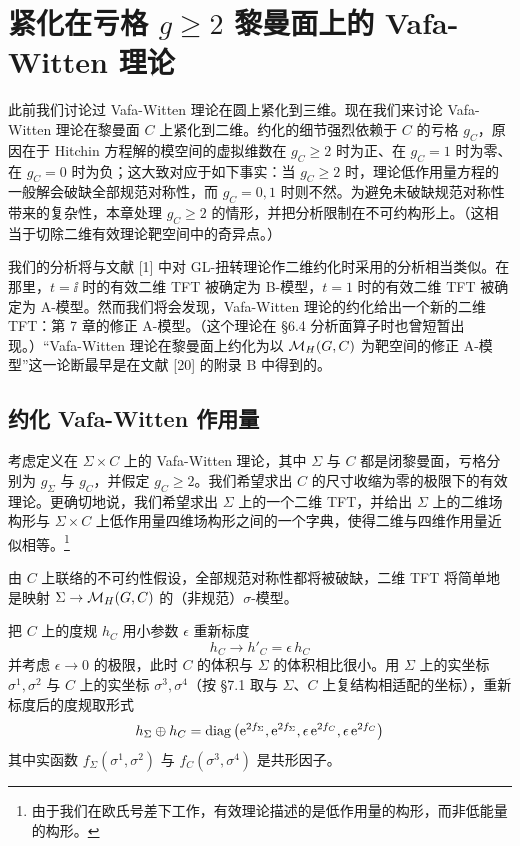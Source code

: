 \chapter{紧化在亏格 \texorpdfstring{$g\ge 2$}{g>=2} 黎曼面上的 Vafa-Witten 理论}

此前我们讨论过 Vafa-Witten 理论在圆上紧化到三维。现在我们来讨论 Vafa-Witten 理论在黎曼面 $C$ 上紧化到二维。约化的细节强烈依赖于 $C$ 的亏格 $g_C$，原因在于 Hitchin 方程解的模空间的虚拟维数在 $g_C\ge 2$ 时为正、在 $g_C=1$ 时为零、在 $g_C=0$ 时为负；这大致对应于如下事实：当 $g_C\ge 2$ 时，理论低作用量方程的一般解会破缺全部规范对称性，而 $g_C=0,1$ 时则不然。为避免未破缺规范对称性带来的复杂性，本章处理 $g_C\ge 2$ 的情形，并把分析限制在不可约构形上。（这相当于切除二维有效理论靶空间中的奇异点。）

我们的分析将与文献 [1] 中对 GL-扭转理论作二维约化时采用的分析相当类似。在那里，$t=\ii$ 时的有效二维 TFT 被确定为 B-模型，$t=1$ 时的有效二维 TFT 被确定为 A-模型。然而我们将会发现，Vafa-Witten 理论的约化给出一个新的二维 TFT：第 7 章的修正 A-模型。（这个理论在 §6.4 分析面算子时也曾短暂出现。）“Vafa-Witten 理论在黎曼面上约化为以 $\mathcal{M}_H(G,C)$ 为靶空间的修正 A-模型”这一论断最早是在文献 [20] 的附录 B 中得到的。

\section{约化 Vafa-Witten 作用量}

考虑定义在 $\Sigma\times C$ 上的 Vafa-Witten 理论，其中 $\Sigma$ 与 $C$ 都是闭黎曼面，亏格分别为 $g_\Sigma$ 与 $g_C$，并假定 $g_C\ge 2$。我们希望求出 $C$ 的尺寸收缩为零的极限下的有效理论。更确切地说，我们希望求出 $\Sigma$ 上的一个二维 TFT，并给出 $\Sigma$ 上的二维场构形与 $\Sigma\times C$ 上低作用量四维场构形之间的一个字典，使得二维与四维作用量近似相等。\footnote{由于我们在欧氏号差下工作，有效理论描述的是低作用量的构形，而非低能量的构形。}

由 $C$ 上联络的不可约性假设，全部规范对称性都将被破缺，二维 TFT 将简单地是映射 $\Sigma\to\mathcal{M}_H(G,C)$ 的（非规范）$\sigma$-模型。

把 $C$ 上的度规 $h_C$ 用小参数 $\epsilon$ 重新标度
\[
h_C\to h'_C=\epsilon\,h_C
\]
并考虑 $\epsilon\to 0$ 的极限，此时 $C$ 的体积与 $\Sigma$ 的体积相比很小。用 $\Sigma$ 上的实坐标 $\sigma^1,\sigma^2$ 与 $C$ 上的实坐标 $\sigma^3,\sigma^4$（按 §7.1 取与 $\Sigma$、$C$ 上复结构相适配的坐标），重新标度后的度规取形式
\[
h_\Sigma\oplus h_C=\operatorname{diag}\left(\mathrm{e}^{2f_\Sigma},\mathrm{e}^{2f_\Sigma},\epsilon\,\mathrm{e}^{2f_C},\epsilon\,\mathrm{e}^{2f_C}\right)
\]
其中实函数 $f_\Sigma(\sigma^1,\sigma^2)$ 与 $f_C(\sigma^3,\sigma^4)$ 是共形因子。

